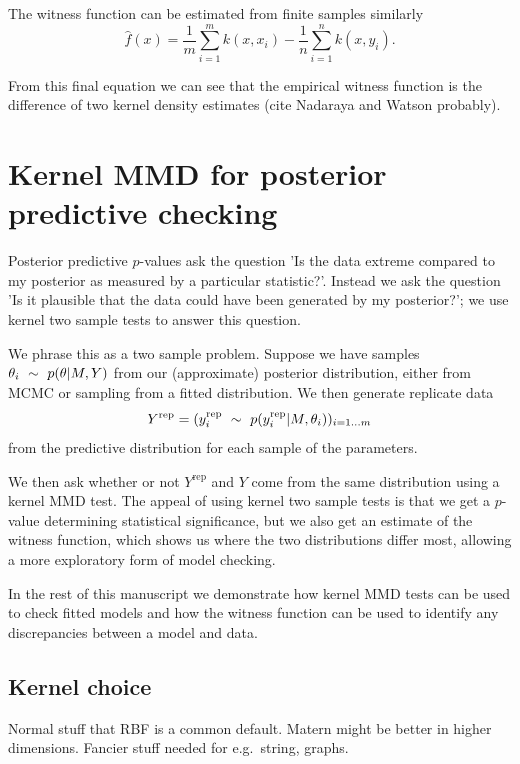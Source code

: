 \documentclass{article}
\def\eg{e.g.\ }
\begin{document}
The witness function can be estimated from finite samples similarly
\begin{equation}
\hat{f}(x) = \frac{1}{m}\sum_{i=1}^{m}k(x,x_i) - \frac{1}{n}\sum_{i=1}^{n}k(x,y_i).
\end{equation}

From this final equation we can see that the empirical witness function is the difference of two kernel density estimates (cite Nadaraya and Watson probably).

\section{Kernel MMD for posterior predictive checking}

Posterior predictive $p$-values ask the question 'Is the data extreme compared to my posterior as measured by a particular statistic?'.
Instead we ask the question 'Is it plausible that the data could have been generated by my posterior?'; we use kernel two sample tests to answer this question.

We phrase this as a two sample problem.
Suppose we have samples $\theta_i \ \sim\  p(\theta|M,Y)$ from our (approximate) posterior distribution, either from MCMC or sampling from a fitted distribution.
We then generate replicate data
\begin{equation}
Y^\textrm{rep} = (y^\textrm{rep}_i \ \sim\  p(y^\textrm{rep}_i|M,\theta_i))_{i=1\ldots m}
\end{equation}
from the predictive distribution for each sample of the parameters.

We then ask whether or not $Y^\textrm{rep}$ and $Y$ come from the same distribution using a kernel MMD test.
The appeal of using kernel two sample tests is that we get a $p$-value determining statistical significance, but we also get an estimate of the witness function, which shows us where the two distributions differ most, allowing a more exploratory form of model checking.

In the rest of this manuscript we demonstrate how kernel MMD tests can be used to check fitted models and how the witness function can be used to identify any discrepancies between a model and data.

\subsection{Kernel choice}

Normal stuff that RBF is a common default.
Matern might be better in higher dimensions.
Fancier stuff needed for \eg string, graphs.
\end{document}
